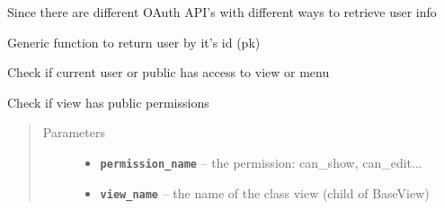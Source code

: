 \documentclass[letterpaper,10pt,english]{sphinxmanual}
\begin{document}
\begin{fulllineitems}
\begin{fulllineitems}
\label{api:flask.ext.appbuilder.security.manager.BaseSecurityManager.get_oauth_user_info}
Since there are different OAuth API's with different ways to
retrieve user info

\end{fulllineitems}


\begin{fulllineitems}
\label{api:flask.ext.appbuilder.security.manager.BaseSecurityManager.get_user_by_id}
Generic function to return user by it's id (pk)

\end{fulllineitems}


\begin{fulllineitems}
\label{api:flask.ext.appbuilder.security.manager.BaseSecurityManager.has_access}
Check if current user or public has access to view or menu

\end{fulllineitems}


\begin{fulllineitems}
\label{api:flask.ext.appbuilder.security.manager.BaseSecurityManager.is_item_public}
Check if view has public permissions
\begin{quote}\begin{description}
\item[{Parameters}] \leavevmode\begin{itemize}
\item {} 
\textbf{\texttt{permission\_name}} -- the permission: can\_show, can\_edit...

\item {} 
\textbf{\texttt{view\_name}} -- the name of the class view (child of BaseView)


\end{itemize}
\end{description}
\end{quote}
\end{fulllineitems}
\end{fulllineitems}
\end{document}
